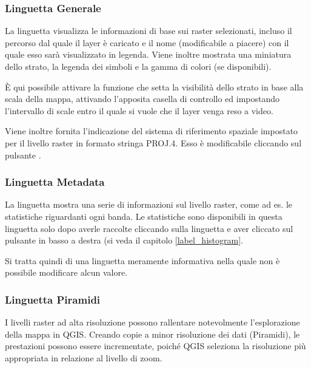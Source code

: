 \subsubsection{Linguetta Generale}\label{label_generaltab}

La linguetta  visualizza le informazioni di base sui raster selezionati,
incluso il percorso dal quale il layer è caricato e il nome (modificabile a
piacere) con il quale esso sarà visualizzato in legenda. Viene inoltre
mostrata una miniatura dello strato, la legenda dei simboli e la gamma di
colori (se disponibili). 

È qui possibile attivare la funzione che setta la visibilità dello strato
in base alla scala della mappa, attivando l'apposita casella di controllo ed
impostando l'intervallo di scale entro il quale si vuole che il layer venga
reso a video.

Viene inoltre fornita l'indicazione del sistema di riferimento spaziale
impostato per il livello raster in formato stringa PROJ.4. Esso è modificabile
cliccando sul pulsante .

\subsubsection{Linguetta Metadata}\label{label_metatab}

La linguetta  mostra una serie di informazioni sul livello
raster, come ad es. le statistiche riguardanti ogni banda. Le statistiche sono
disponibili in questa linguetta solo dopo averle raccolte cliccando sulla
linguetta  e aver cliccato sul pulsante   in
basso a destra (si veda il capitolo \ref{label_histogram}.

Si tratta quindi di una linguetta meramente informativa nella quale non è
possibile modificare alcun valore.

\subsubsection{Linguetta Piramidi}\label{raster_pyramids}

I livelli raster ad alta risoluzione possono rallentare notevolmente
l'esplorazione della mappa in QGIS. Creando copie a minor risoluzione dei dati
(Piramidi), le prestazioni possono essere incrementate, poiché QGIS seleziona
la risoluzione più appropriata in relazione al livello di zoom.

